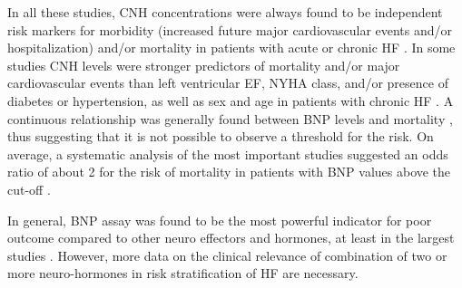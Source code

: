 \documentclass[14pt,a4paper,onecolumn]{extarticle}
\begin{document}
In all these studies, CNH concentrations were always found to be independent risk markers for morbidity (increased future major cardiovascular events and/or hospitalization) and/or mortality in patients with acute or chronic HF \citep{bib35}. In some studies CNH levels were stronger predictors of mortality and/or major cardiovascular events than left ventricular EF, NYHA class, and/or presence of diabetes or hypertension, as well as sex and age in patients with chronic HF \citep{bib3188} \citep{bib3189} \citep{bib3192} \citep{bib3194} \citep{bib3195} \citep{bib3206} \citep{bib3198} \citep{bib3199}.
A continuous relationship was generally found between BNP levels and mortality \citep{bib3194}, thus suggesting that it is not possible to observe a threshold for the risk. On average, a systematic analysis of the most important studies suggested an odds ratio of about 2 for the risk of mortality in patients with BNP values above the cut-off \citep{bib35}.


In general, BNP assay was found to be the most powerful indicator for poor outcome compared to other neuro effectors and hormones, at least in the largest studies \citep{bib35} \citep{bib3204} \citep{bib3206}. However, more data on the clinical relevance of combination of two or more neuro-hormones in risk stratification of HF are necessary.
\end{document}
